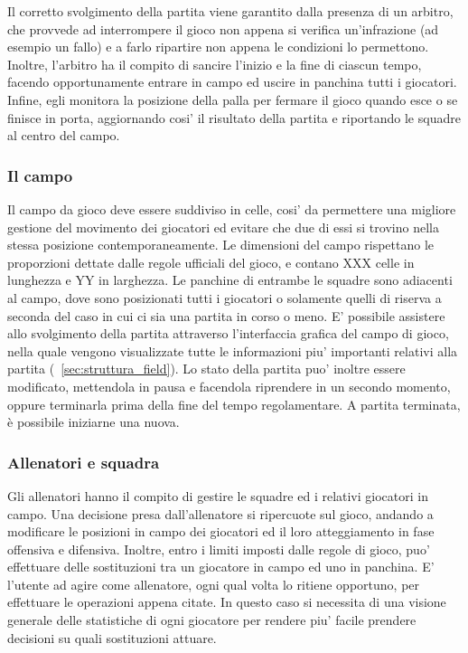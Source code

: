 Il corretto svolgimento della partita viene garantito dalla presenza di un arbitro, che provvede ad interrompere il gioco non appena si verifica un'infrazione (ad esempio un fallo) e a farlo ripartire non appena le condizioni lo permettono. Inoltre, l'arbitro ha il compito di sancire l'inizio e la fine di ciascun tempo, facendo opportunamente entrare in campo ed uscire in panchina tutti i giocatori. Infine, egli monitora la posizione della palla per fermare il gioco quando esce o se finisce in porta, aggiornando cosi' il risultato della partita e riportando le squadre al centro del campo.\\

\subsubsection{Il campo}
\label{sec:analisi_campo}

Il campo da gioco deve essere suddiviso in celle, cosi' da permettere una migliore gestione del movimento dei giocatori ed evitare che due di essi si trovino nella stessa posizione contemporaneamente. Le dimensioni del campo rispettano le proporzioni dettate dalle regole ufficiali del gioco, e contano XXX celle in lunghezza e YY in larghezza. Le panchine di entrambe le squadre sono adiacenti al campo, dove sono posizionati tutti i giocatori o solamente quelli di riserva a seconda del caso in cui ci sia una partita in corso o meno. E' possibile assistere allo svolgimento della partita attraverso l'interfaccia grafica del campo di gioco, nella quale vengono visualizzate tutte le informazioni piu' importanti relativi alla partita (~\ref{sec:struttura_field}). Lo stato della partita puo' inoltre essere modificato, mettendola in pausa e facendola riprendere in un secondo momento, oppure terminarla prima della fine del tempo regolamentare. A partita terminata, \`{e} possibile iniziarne una nuova.\\

\subsubsection{Allenatori e squadra}
\label{sec:analisi_allenatori}

Gli allenatori hanno il compito di gestire le squadre ed i relativi giocatori in campo. Una decisione presa dall'allenatore si ripercuote sul gioco, andando a modificare le posizioni in campo dei giocatori ed il loro atteggiamento in fase offensiva e difensiva. Inoltre, entro i limiti imposti dalle regole di gioco, puo' effettuare delle sostituzioni tra un giocatore in campo ed uno in panchina. E' l'utente ad agire come allenatore, ogni qual volta lo ritiene opportuno, per effettuare le operazioni appena citate. In questo caso si necessita di una visione generale delle statistiche di ogni giocatore per rendere piu' facile prendere decisioni su quali sostituzioni attuare.

